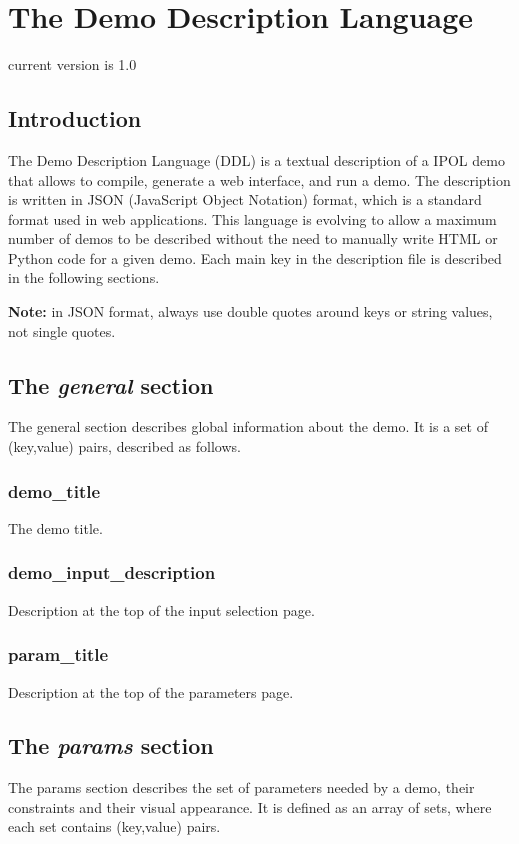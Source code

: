 \section{The Demo Description Language}

current version is 1.0

\subsection{Introduction}
The Demo Description Language (DDL) is a textual description of a IPOL demo that 
allows to compile, generate a web interface, and run a demo. The description is 
written in JSON (JavaScript Object Notation) format, which is a standard format 
used in web applications. This language is evolving to allow a maximum number 
of demos to be described without the need to manually write HTML or Python code 
for a given demo. Each main key in the description file is described in the 
following sections.


{\bf Note:} in JSON format, always use double quotes around keys or string 
values, not single quotes.

\subsection{The \emph{general} section}
The general section describes global information about the demo. It is a set of 
(key,value) pairs, described as follows.
\subsubsection{demo\_title}
The demo title.
\subsubsection{demo\_input\_description}
Description at the top of the input selection page.
\subsubsection{param\_title}
Description at the top of the parameters page.

\subsection{The \emph{params} section}
The params section describes the set of parameters needed by a demo, their 
constraints and their visual appearance. It is defined as an array of sets, 
where each set contains (key,value) pairs.

